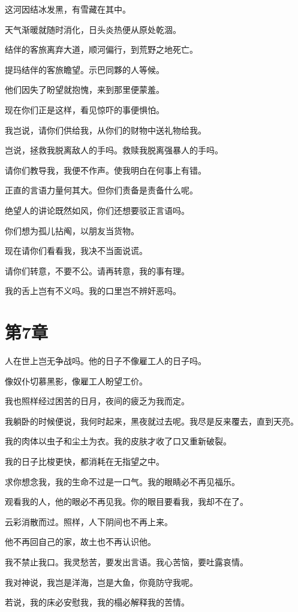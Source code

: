 \documentclass[12pt,oneside]{book}
\begin{document}
这河因结冰发黑，有雪藏在其中。

天气渐暖就随时消化，日头炎热便从原处乾涸。

结伴的客旅离弃大道，顺河偏行，到荒野之地死亡。

提玛结伴的客旅瞻望。示巴同夥的人等候。

他们因失了盼望就抱愧，来到那里便蒙羞。

现在你们正是这样，看见惊吓的事便惧怕。

我岂说，请你们供给我，从你们的财物中送礼物给我。

岂说，拯救我脱离敌人的手吗。救赎我脱离强暴人的手吗。

请你们教导我，我便不作声。使我明白在何事上有错。

正直的言语力量何其大。但你们责备是责备什么呢。

绝望人的讲论既然如风，你们还想要驳正言语吗。

你们想为孤儿拈阄，以朋友当货物。

现在请你们看看我，我决不当面说谎。

请你们转意，不要不公。请再转意，我的事有理。

我的舌上岂有不义吗。我的口里岂不辨奸恶吗。



\chapter{第7章}
人在世上岂无争战吗。他的日子不像雇工人的日子吗。

像奴仆切慕黑影，像雇工人盼望工价。

我也照样经过困苦的日月，夜间的疲乏为我而定。

我躺卧的时候便说，我何时起来，黑夜就过去呢。我尽是反来覆去，直到天亮。

我的肉体以虫子和尘土为衣。我的皮肤才收了口又重新破裂。

我的日子比梭更快，都消耗在无指望之中。

求你想念我，我的生命不过是一口气。我的眼睛必不再见福乐。

观看我的人，他的眼必不再见我。你的眼目要看我，我却不在了。

云彩消散而过。照样，人下阴间也不再上来。

他不再回自己的家，故土也不再认识他。

我不禁止我口。我灵愁苦，要发出言语。我心苦恼，要吐露哀情。

我对神说，我岂是洋海，岂是大鱼，你竟防守我呢。

若说，我的床必安慰我，我的榻必解释我的苦情。
\end{document}

